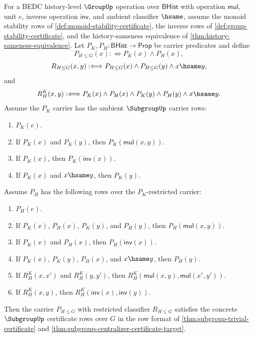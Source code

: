 \begin{theorem}
\label{thm:subgroup-chain-composition-certificate}
For a BEDC history-level $\GroupUp$ operation over $\mathsf{BHist}$ with
operation $\mathsf{mul}$, unit $e$, inverse operation $\mathsf{inv}$, and
ambient classifier $\hsame$, assume the monoid stability rows of
\autoref{def:monoid-stability-certificate}, the inverse rows of
\autoref{def:group-stability-certificate}, and the history-sameness equivalence
of \autoref{thm:history-sameness-equivalence}. Let
$P_K,P_H:\mathsf{BHist}\to\mathsf{Prop}$ be carrier predicates and define
$$
P_{H\leq G}(x):\Longleftrightarrow P_K(x)\land P_H(x),
$$
$$
R_{H\leq G}(x,y):\Longleftrightarrow
P_{H\leq G}(x)\land P_{H\leq G}(y)\land x\hsame y,
$$
and
$$
R_H^K(x,y):\Longleftrightarrow
P_K(x)\land P_H(x)\land P_K(y)\land P_H(y)\land x\hsame y.
$$
Assume the $P_K$ carrier has the ambient $\SubgroupUp$ carrier rows:
\begin{enumerate}
\item $P_K(e)$.
\item If $P_K(x)$ and $P_K(y)$, then $P_K(\mathsf{mul}(x,y))$.
\item If $P_K(x)$, then $P_K(\mathsf{inv}(x))$.
\item If $P_K(x)$ and $x\hsame y$, then $P_K(y)$.
\end{enumerate}
Assume $P_H$ has the following rows over the $P_K$-restricted carrier:
\begin{enumerate}
\item $P_H(e)$.
\item If $P_K(x)$, $P_H(x)$, $P_K(y)$, and $P_H(y)$, then
$P_H(\mathsf{mul}(x,y))$.
\item If $P_K(x)$ and $P_H(x)$, then $P_H(\mathsf{inv}(x))$.
\item If $P_K(x)$, $P_K(y)$, $P_H(x)$, and $x\hsame y$, then $P_H(y)$.
\item If $R_H^K(x,x')$ and $R_H^K(y,y')$, then
$R_H^K(\mathsf{mul}(x,y),\mathsf{mul}(x',y'))$.
\item If $R_H^K(x,y)$, then
$R_H^K(\mathsf{inv}(x),\mathsf{inv}(y))$.
\end{enumerate}
Then the carrier $P_{H\leq G}$ with restricted classifier $R_{H\leq G}$
satisfies the concrete $\SubgroupUp$ certificate rows over $G$ in the row
format of \autoref{thm:subgroup-trivial-certificate} and
\autoref{thm:subgroup-centralizer-certificate-target}.
\end{theorem}
